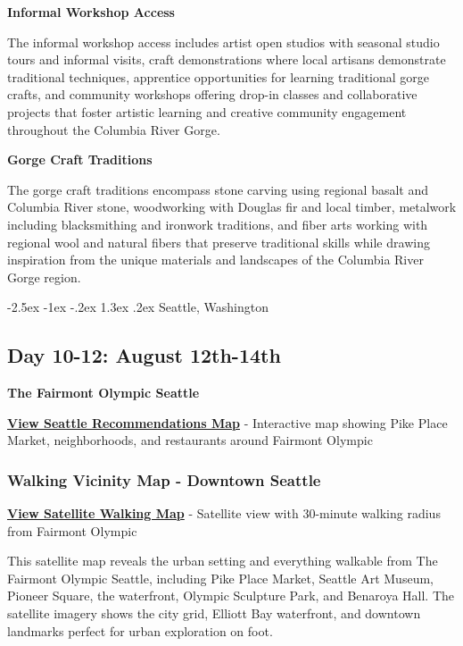\documentclass[
  11pt,
  letterpaper,
  DIV=10,
  numbers=noendperiod]{scrartcl}
\makeatletter
\renewcommand{\section}{\@startsection{section}{1}{\z@}%
  {-2.5ex \@plus -1ex \@minus -.2ex}%
  {1.3ex \@plus .2ex}%
  {\normalfont\fontsize{16}{19}\bfseries\color{twinpeaksred}}}
\makeatother
\begin{document}
\textbf{Informal Workshop Access}

The informal workshop access includes artist open studios with seasonal
studio tours and informal visits, craft demonstrations where local
artisans demonstrate traditional techniques, apprentice opportunities
for learning traditional gorge crafts, and community workshops offering
drop-in classes and collaborative projects that foster artistic learning
and creative community engagement throughout the Columbia River Gorge.

\textbf{Gorge Craft Traditions}

The gorge craft traditions encompass stone carving using regional basalt
and Columbia River stone, woodworking with Douglas fir and local timber,
metalwork including blacksmithing and ironwork traditions, and fiber
arts working with regional wool and natural fibers that preserve
traditional skills while drawing inspiration from the unique materials
and landscapes of the Columbia River Gorge region.

\newpage

\section{Seattle, Washington}\label{seattle-washington}

\subsection{Day 10-12: August
12th-14th}\label{day-10-12-august-12th-14th}

\textbf{The Fairmont Olympic Seattle}

\textbf{\href{images/seattle_washington_recommendations_map.html}{View
Seattle Recommendations Map}} - Interactive map showing Pike Place
Market, neighborhoods, and restaurants around Fairmont Olympic

\subsubsection{Walking Vicinity Map - Downtown
Seattle}\label{walking-vicinity-map---downtown-seattle}

\textbf{\href{images/seattle_wa_walking_map.html}{View Satellite Walking
Map}} - Satellite view with 30-minute walking radius from Fairmont
Olympic

This satellite map reveals the urban setting and everything walkable
from The Fairmont Olympic Seattle, including Pike Place Market, Seattle
Art Museum, Pioneer Square, the waterfront, Olympic Sculpture Park, and
Benaroya Hall. The satellite imagery shows the city grid, Elliott Bay
waterfront, and downtown landmarks perfect for urban exploration on
foot.
\end{document}
